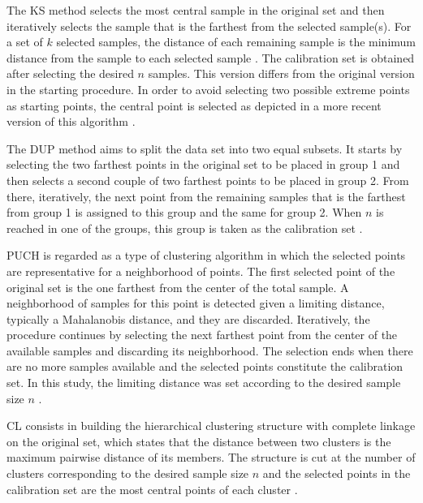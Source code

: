 \documentclass[preprint,12pt]{elsarticle}
\begin{document}
The KS method selects the most central sample in the original set and then iteratively selects the sample that is the farthest from the selected sample(s). For a set of $k$ selected samples, the distance of each remaining sample is the minimum distance from the sample to each selected sample \cite{Kennard1969}. The calibration set is obtained after selecting the desired $n$ samples. This version differs from the original version in the starting procedure. In order to avoid selecting two possible extreme points as starting points, the central point is selected as depicted in a more recent version of this algorithm \cite{Ramirez-Lopez2014}.

The DUP method aims to split the data set into two equal subsets. It starts by selecting the two farthest points in the original set to be placed in group 1 and then selects a second couple of two farthest points to be placed in group 2. From there, iteratively, the next point from the remaining samples that is the farthest from group 1 is assigned to this group and the same for group 2. When $n$ is reached in one of the groups, this group is taken as the calibration set \cite{Snee1977}.

PUCH is regarded as a type of clustering algorithm in which the selected points are representative for a neighborhood of points. The first selected point of the original set is the one farthest from the center of the total sample. A neighborhood of samples for this point is detected given a limiting distance, typically a Mahalanobis distance, and they are discarded. Iteratively, the procedure continues by selecting the next farthest point from the center of the available samples and discarding its neighborhood. The selection ends when there are no more samples available and the selected points constitute the calibration set. In this study, the limiting distance was set according to the desired sample size $n$ \cite{Puchwein1988}.

CL consists in building the hierarchical clustering structure with complete linkage on the original set, which states that the distance between two clusters is the maximum pairwise distance of its members. The structure is cut at the number of clusters corresponding to the desired sample size $n$ and the selected points in the calibration set are the most central points of each cluster \cite{Naes1990}.
\end{document}
